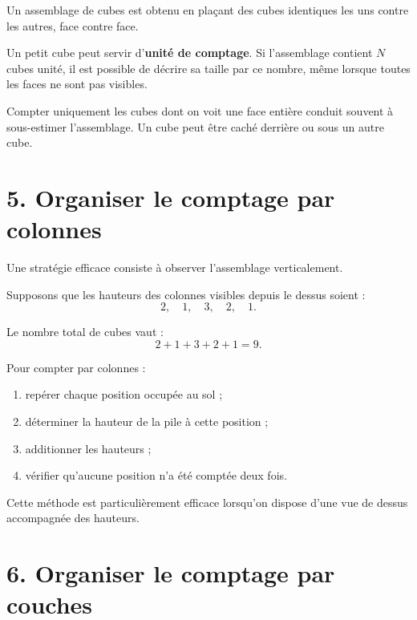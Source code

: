 Un assemblage de cubes est obtenu en plaçant des cubes identiques les uns contre les autres, face contre face.


Un petit cube peut servir d'\textbf{unité de comptage}. Si l'assemblage contient $N$ cubes unité, il est possible de décrire sa taille par ce nombre, même lorsque toutes les faces ne sont pas visibles.

\begin{attention}
Compter uniquement les cubes dont on voit une face entière conduit souvent à sous-estimer l'assemblage. Un cube peut être caché derrière ou sous un autre cube.
\end{attention}

\section{5. Organiser le comptage par colonnes}

Une stratégie efficace consiste à observer l'assemblage verticalement.

Supposons que les hauteurs des colonnes visibles depuis le dessus soient :
\[
2,\quad 1,\quad 3,\quad 2,\quad 1.
\]

Le nombre total de cubes vaut :
\[
2+1+3+2+1=9.
\]

\begin{methode}
Pour compter par colonnes :
\begin{enumerate}
\item repérer chaque position occupée au sol ;
\item déterminer la hauteur de la pile à cette position ;
\item additionner les hauteurs ;
\item vérifier qu'aucune position n'a été comptée deux fois.
\end{enumerate}
\end{methode}

Cette méthode est particulièrement efficace lorsqu'on dispose d'une vue de dessus accompagnée des hauteurs.

\section{6. Organiser le comptage par couches}


